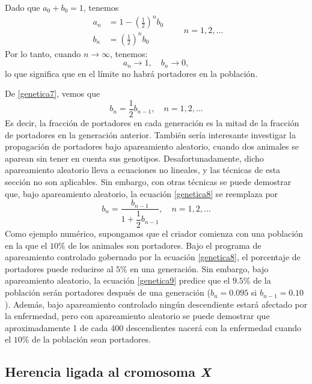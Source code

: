 \newpage\noindent
Dado que $a_0 + b_0 = 1$, tenemos
\begin{equation}
    \begin{aligned}
        a_n & = 1 - \left(\frac{1}{2}\right)^n b_0 \\
        b_n & = \left(\frac{1}{2}\right)^n b_0
    \end{aligned} \qquad n = 1, 2, \dots \label{genetica7}
\end{equation}
Por lo tanto, cuando $n \to \infty$, tenemos:
$$a_n \to 1, \quad b_n \to 0,$$
lo que significa que en el límite no habrá portadores en la población.

De \eqref{genetica7}, vemos que
\begin{equation}
    b_n = \frac{1}{2}b_{n-1}, \quad n = 1, 2, \dots \label{genetica8}
\end{equation}
Es decir, la fracción de portadores en cada generación es la mitad de la fracción de portadores en la generación anterior. También sería interesante investigar la propagación de portadores bajo apareamiento aleatorio, cuando dos animales se aparean sin tener en cuenta sus genotipos. Desafortunadamente, dicho apareamiento aleatorio lleva a ecuaciones no lineales, y las técnicas de esta sección no son aplicables. Sin embargo, con otras técnicas se puede demostrar que, bajo apareamiento aleatorio, la ecuación \eqref{genetica8} se reemplaza por
\begin{equation}
    b_n = \frac{b_{n-1}}{1 + \dfrac{1}{2}b_{n-1}}, \quad n = 1, 2, \dots \label{genetica9}
\end{equation}
Como ejemplo numérico, supongamos que el criador comienza con una población en la que el $10\%$ de los animales son portadores. Bajo el programa de apareamiento controlado gobernado por la ecuación \eqref{genetica8}, el porcentaje de portadores puede reducirse al $5\%$ en una generación. Sin embargo, bajo apareamiento aleatorio, la ecuación \eqref{genetica9} predice que el $9.5\%$ de la población serán portadores después de una generación ($b_n = 0.095$ si $b_{n-1} = 0.10$). Además, bajo apareamiento controlado ningún descendiente estará afectado por la enfermedad, pero con apareamiento aleatorio se puede demostrar que aproximadamente 1 de cada 400 descendientes nacerá con la enfermedad cuando el $10\%$ de la población sean portadores.

\subsection*{Herencia ligada al cromosoma \textit{X}}

